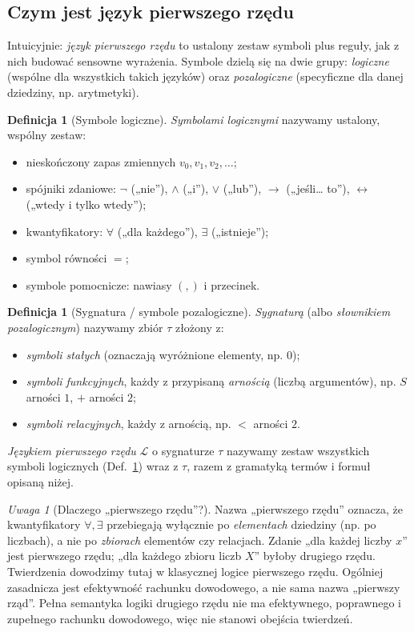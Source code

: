 \documentclass[11pt,a4paper]{article}
\numberwithin{equation}{section}
\theoremstyle{plain}
\theoremstyle{definition}
\newtheorem{definicja}[twierdzenie]{Definicja}
\theoremstyle{remark}
\newtheorem{uwaga}[twierdzenie]{Uwaga}
\begin{document}
\subsection*{Czym jest język pierwszego rzędu}\label{sec:jezyk-pierwszego-rzedu}
Intuicyjnie: \emph{język pierwszego rzędu} to ustalony zestaw symboli plus reguły, jak z nich budować sensowne wyrażenia. Symbole dzielą się na dwie grupy: \emph{logiczne} (wspólne dla wszystkich takich języków) oraz \emph{pozalogiczne} (specyficzne dla danej dziedziny, np. arytmetyki).

\begin{definicja}[Symbole logiczne]\label{res:2:5}
\emph{Symbolami logicznymi} nazywamy ustalony, wspólny zestaw:
\begin{itemize}
\item nieskończony zapas zmiennych $v_0,v_1,v_2,\ldots$;
\item spójniki zdaniowe: $\neg$ („nie”), $\land$ („i”), $\lor$ („lub”), $\to$ („jeśli\ldots{} to”), $\leftrightarrow$ („wtedy i tylko wtedy”);
\item kwantyfikatory: $\forall$ („dla każdego”), $\exists$ („istnieje”);
\item symbol równości $=$;
\item symbole pomocnicze: nawiasy $(,)$ i przecinek.
\end{itemize}
\end{definicja}

\begin{definicja}[Sygnatura / symbole pozalogiczne]\label{res:2:6}
\emph{Sygnaturą} (albo \emph{słownikiem pozalogicznym}) nazywamy zbiór $\tau$ złożony z:
\begin{itemize}
\item \emph{symboli stałych} (oznaczają wyróżnione elementy, np. $0$);
\item \emph{symboli funkcyjnych}, każdy z przypisaną \emph{arnością} (liczbą argumentów), np. $S$ arności $1$, $+$ arności $2$;
\item \emph{symboli relacyjnych}, każdy z arnością, np. $<$ arności $2$.
\end{itemize}
\emph{Językiem pierwszego rzędu} $\mathcal L$ o sygnaturze $\tau$ nazywamy zestaw wszystkich symboli logicznych (Def.~\ref{res:2:5}) wraz z $\tau$, razem z gramatyką termów i formuł opisaną niżej.
\end{definicja}

\begin{uwaga}[Dlaczego „pierwszego rzędu”?]\label{res:2:7}
Nazwa „pierwszego rzędu” oznacza, że kwantyfikatory $\forall,\exists$ przebiegają wyłącznie po \emph{elementach} dziedziny (np. po liczbach), a nie po \emph{zbiorach} elementów czy relacjach. Zdanie „dla każdej liczby $x$” jest pierwszego rzędu; „dla każdego zbioru liczb $X$” byłoby drugiego rzędu. Twierdzenia dowodzimy tutaj w klasycznej logice pierwszego rzędu. Ogólniej zasadnicza jest efektywność rachunku dowodowego, a nie sama nazwa „pierwszy rząd”. Pełna semantyka logiki drugiego rzędu nie ma efektywnego, poprawnego i zupełnego rachunku dowodowego, więc nie stanowi obejścia twierdzeń.
\end{uwaga}
\end{document}
